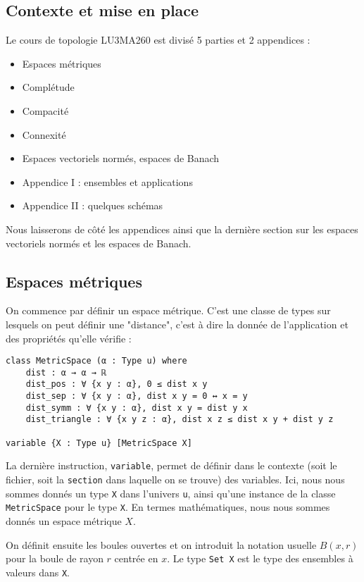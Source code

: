 \documentclass[a4paper, 12pt]{article}
\newcommand{\lean}[1]{\texttt{#1}}
\begin{document}
\subsection{Contexte et mise en place}

Le cours de topologie LU3MA260\cite{topology_memo} est divisé 5 parties et 2 appendices :

\begin{itemize}
    \item Espaces métriques
    \item Complétude
    \item Compacité
    \item Connexité
    \item Espaces vectoriels normés, espaces de Banach
    \item Appendice I : ensembles et applications
    \item Appendice II : quelques schémas
\end{itemize}

Nous laisserons de côté les appendices ainsi que la dernière section sur les espaces vectoriels normés et les espaces de Banach.

\subsection{Espaces métriques}

On commence par définir un espace métrique. C'est une classe de types sur lesquels on peut définir une "distance", c'est à dire la donnée de l'application et des propriétés qu'elle vérifie :

\begin{verbatim}
class MetricSpace (α : Type u) where
    dist : α → α → ℝ
    dist_pos : ∀ {x y : α}, 0 ≤ dist x y
    dist_sep : ∀ {x y : α}, dist x y = 0 ↔ x = y
    dist_symm : ∀ {x y : α}, dist x y = dist y x
    dist_triangle : ∀ {x y z : α}, dist x z ≤ dist x y + dist y z

variable {X : Type u} [MetricSpace X]
\end{verbatim}

La dernière instruction, \lean{variable}, permet de définir dans le contexte (soit le fichier, soit la \lean{section} dans laquelle on se trouve) des variables. Ici, nous nous sommes donnés un type \lean{X} dans l'univers \lean{u}, ainsi qu'une instance de la classe \lean{MetricSpace} pour le type \lean{X}. En termes mathématiques, nous nous sommes donnés un espace métrique $X$.

On définit ensuite les boules ouvertes et on introduit la notation usuelle $B(x, r)$ pour la boule de rayon $r$ centrée en $x$. Le type \lean{Set X} est le type des ensembles à valeurs dans \lean{X}.
\end{document}
